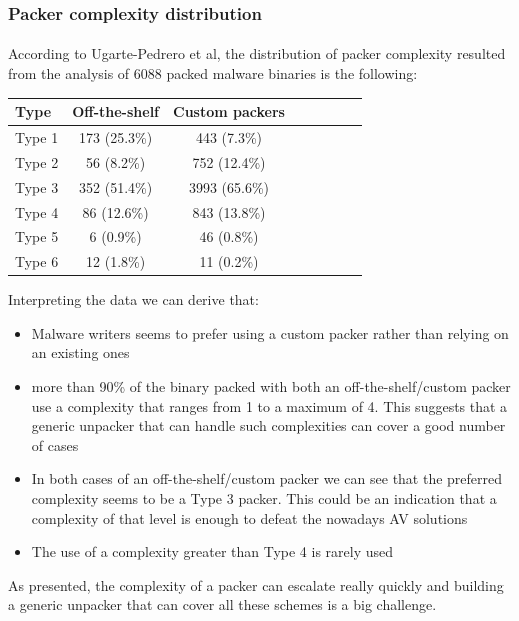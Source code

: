 \subsubsection{Packer complexity distribution}
\paragraph{}
According to Ugarte-Pedrero et al\cite{sokpacker}, the distribution of packer complexity resulted from the analysis of 6088 packed malware binaries is the following:

\begin{table}[H]
\begin{center}
\begin{tabular}{l*{6}{c}r}
Type      & Off-the-shelf & Custom packers \\
\hline
Type 1 &       173 (25.3\%) & 443 (7.3\%) \\
Type 2 &       56 (8.2\%) & 752 (12.4\%) \\
Type 3 &       352 (51.4\%)  & 3993 (65.6\%) \\
Type 4 &       86 (12.6\%) & 843 (13.8\%) \\
Type 5 &       6 (0.9\%)  & 46 (0.8\%) \\
Type 6 &       12 (1.8\%) & 11 (0.2\%) \\
\end{tabular}
\end{center}
\end{table}

Interpreting the data we can derive that:
\begin{itemize}
\item Malware writers seems to prefer using a custom packer rather than relying on an existing ones
\item more than 90\% of the binary packed with both an off-the-shelf/custom packer use a complexity that ranges from 1 to a maximum of 4. This suggests that a generic unpacker that can handle such complexities can cover a good number of cases
\item In both cases of an off-the-shelf/custom packer we can see that the preferred complexity seems to be a Type 3 packer. This could be an indication that a complexity of that level is enough to defeat the nowadays \ac{AV} solutions
\item The use of a complexity greater than Type 4 is rarely used
\end{itemize}
As presented, the complexity of a packer can escalate really quickly and building a generic unpacker that can cover all these schemes is a big challenge.

